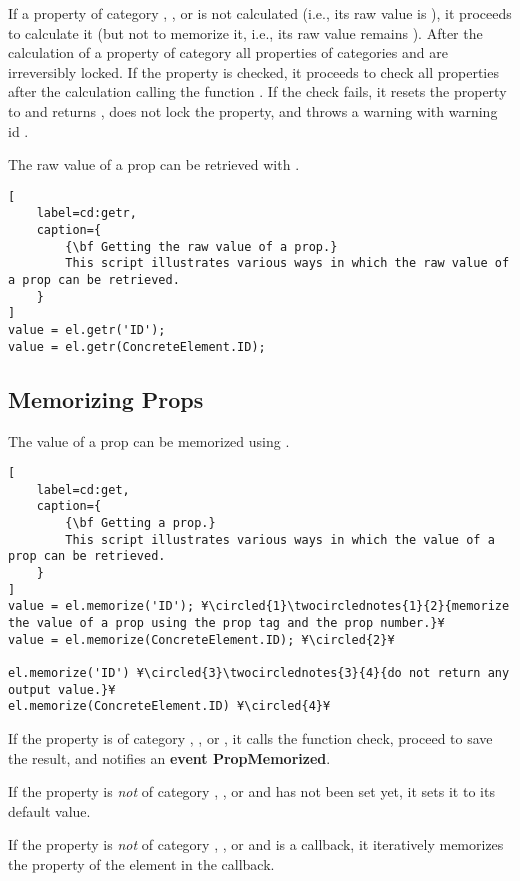 \documentclass{tufte-handout}
\begin{document}
If a property of category , , or  is not calculated (i.e., its raw value is ), it proceeds to calculate it (but not to memorize it, i.e., its raw value remains ). After the calculation of a property of category  all properties of categories  and  are irreversibly locked.
If the property is checked, it proceeds to check all properties after the calculation calling the function . If the check fails, it resets the property to  and returns , does not lock the property, and throws a warning with warning id .

The raw value of a prop can be retrieved with .
%
\begin{lstlisting}[
	label=cd:getr,
	caption={
		{\bf Getting the raw value of a prop.}
		This script illustrates various ways in which the raw value of a prop can be retrieved.
	}
]
value = el.getr('ID');
value = el.getr(ConcreteElement.ID);
\end{lstlisting}

\subsection{Memorizing Props}  

The value of a prop can be memorized using .
%
\begin{lstlisting}[
	label=cd:get,
	caption={
		{\bf Getting a prop.}
		This script illustrates various ways in which the value of a prop can be retrieved.
	}
]
value = el.memorize('ID'); ¥\circled{1}\twocirclednotes{1}{2}{memorize the value of a prop using the prop tag and the prop number.}¥
value = el.memorize(ConcreteElement.ID); ¥\circled{2}¥

el.memorize('ID') ¥\circled{3}\twocirclednotes{3}{4}{do not return any output value.}¥
el.memorize(ConcreteElement.ID) ¥\circled{4}¥
\end{lstlisting}

If the property is of category , , or , it calls the function check, proceed to save the result, and notifies an {\bf event PropMemorized}.

If the property is \emph{not} of category , , or  and has not been set yet, it sets it to its default value.
 
If the property is \emph{not} of category , , or  and is a callback, it iteratively memorizes the property of the element in the callback.
 
\end{document}

